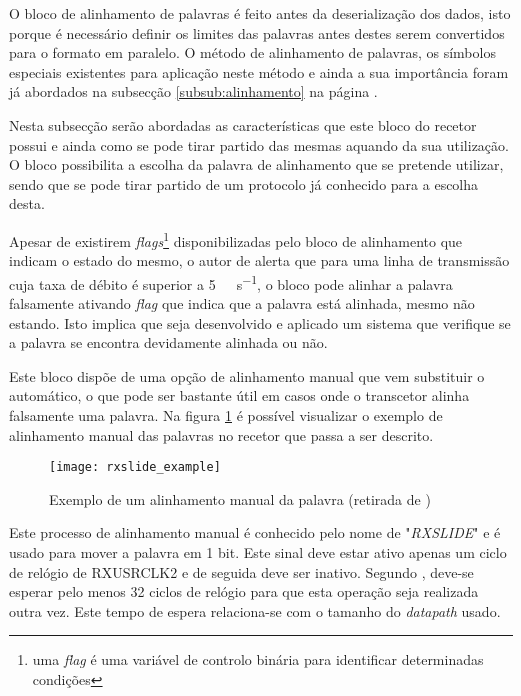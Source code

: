 O bloco de alinhamento de palavras é feito antes da deserialização dos dados, isto porque é necessário definir os limites das palavras antes destes serem convertidos para o formato em paralelo. O método de alinhamento de palavras, os símbolos especiais existentes para aplicação neste método e ainda a sua importância foram já abordados na subsecção \ref{subsub:alinhamento} na página \pageref{subsub:alinhamento}.

Nesta subsecção serão abordadas as características que este bloco do recetor possui e ainda como se pode tirar partido das mesmas aquando da sua utilização. O bloco possibilita a escolha da palavra de alinhamento que se pretende utilizar, sendo que se pode tirar partido de um protocolo já conhecido para a escolha desta.

Apesar de existirem \textit{flags}\footnote{uma \textit{flag} é uma variável de controlo binária para identificar determinadas condições} disponibilizadas pelo bloco de alinhamento que indicam o estado do mesmo, o autor de \cite{R011} alerta que para uma linha de transmissão cuja taxa de débito é superior a \SI{5}{\giga\bit\per\second}, o bloco pode alinhar a palavra falsamente ativando \textit{flag} que indica que a palavra está alinhada, mesmo não estando. Isto implica que seja desenvolvido e aplicado um sistema que verifique se a palavra se encontra devidamente alinhada ou não.


Este bloco dispõe de uma opção de alinhamento manual que vem substituir o automático, o que pode ser bastante útil em casos onde o transcetor alinha falsamente uma palavra. Na figura \ref{fig:rxslide_example} é possível visualizar o exemplo de alinhamento manual das palavras no recetor que passa a ser descrito.

\begin{figure}[h!]
	\begin{center}
		\leavevmode
		\texttt{[image: rxslide\_example]}
		\captionsetup{width=1.0\linewidth}
		\caption[Exemplo de um alinhamento manual da palavra]{Exemplo de um alinhamento manual da palavra (retirada de \cite{R011})}
		\label{fig:rxslide_example}
	\end{center}
\end{figure}

Este processo de alinhamento manual é conhecido pelo nome de "\textit{RXSLIDE}" e é usado para mover a palavra em 1 bit. Este sinal deve estar ativo apenas um ciclo de relógio de RXUSRCLK2 e de seguida deve ser inativo. Segundo \cite{R011}, deve-se esperar pelo menos 32 ciclos de relógio para que esta operação seja realizada outra vez. Este tempo de espera relaciona-se com o tamanho do \textit{datapath} usado.

